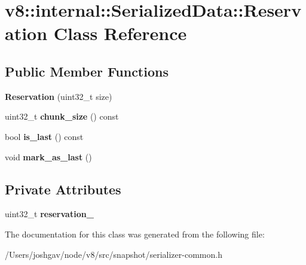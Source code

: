 \hypertarget{classv8_1_1internal_1_1_serialized_data_1_1_reservation}{}\section{v8\+:\+:internal\+:\+:Serialized\+Data\+:\+:Reservation Class Reference}
\label{classv8_1_1internal_1_1_serialized_data_1_1_reservation}
\subsection*{Public Member Functions}
\begin{DoxyCompactItemize}
\item 
{\bfseries Reservation} (uint32\+\_\+t size)\hypertarget{classv8_1_1internal_1_1_serialized_data_1_1_reservation_a279ebec1e43ead301efff752242e8124}{}\label{classv8_1_1internal_1_1_serialized_data_1_1_reservation_a279ebec1e43ead301efff752242e8124}

\item 
uint32\+\_\+t {\bfseries chunk\+\_\+size} () const \hypertarget{classv8_1_1internal_1_1_serialized_data_1_1_reservation_ae0f860a32b02c2f45cb02b8022b33bd3}{}\label{classv8_1_1internal_1_1_serialized_data_1_1_reservation_ae0f860a32b02c2f45cb02b8022b33bd3}

\item 
bool {\bfseries is\+\_\+last} () const \hypertarget{classv8_1_1internal_1_1_serialized_data_1_1_reservation_a4528292a05ebe40db140be74309738c7}{}\label{classv8_1_1internal_1_1_serialized_data_1_1_reservation_a4528292a05ebe40db140be74309738c7}

\item 
void {\bfseries mark\+\_\+as\+\_\+last} ()\hypertarget{classv8_1_1internal_1_1_serialized_data_1_1_reservation_aa98e7d8e118ce2b8e4f5e2246b1bc8e0}{}\label{classv8_1_1internal_1_1_serialized_data_1_1_reservation_aa98e7d8e118ce2b8e4f5e2246b1bc8e0}

\end{DoxyCompactItemize}
\subsection*{Private Attributes}
\begin{DoxyCompactItemize}
\item 
uint32\+\_\+t {\bfseries reservation\+\_\+}\hypertarget{classv8_1_1internal_1_1_serialized_data_1_1_reservation_a1227f3a1951653ecd1ee378b60a7ce22}{}\label{classv8_1_1internal_1_1_serialized_data_1_1_reservation_a1227f3a1951653ecd1ee378b60a7ce22}

\end{DoxyCompactItemize}


The documentation for this class was generated from the following file\+:\begin{DoxyCompactItemize}
\item 
/\+Users/joshgav/node/v8/src/snapshot/serializer-\/common.\+h\end{DoxyCompactItemize}
